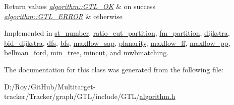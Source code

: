 \begin{DoxyRetVals}{Return values}
{\em \mbox{\hyperlink{classalgorithm_af1a0078e153aa99c24f9bdf0d97f6710a5114c20e4a96a76b5de9f28bf15e282b}{algorithm\+::\+G\+T\+L\+\_\+\+OK}}} & on success \\
\hline
{\em \mbox{\hyperlink{classalgorithm_af1a0078e153aa99c24f9bdf0d97f6710a6fcf574690bbd6cf710837a169510dd7}{algorithm\+::\+G\+T\+L\+\_\+\+E\+R\+R\+OR}}} & otherwise \\
\hline
\end{DoxyRetVals}


Implemented in \mbox{\hyperlink{classst__number_af902a0c05d07d47b587e8f7a6b7beaa1}{st\+\_\+number}}, \mbox{\hyperlink{classratio__cut__partition_a4ab180ca4cf57c811e3478c3de4c4dc3}{ratio\+\_\+cut\+\_\+partition}}, \mbox{\hyperlink{classfm__partition_a015b171fcaa01973ebe6c6a46a727097}{fm\+\_\+partition}}, \mbox{\hyperlink{classdijkstra_a7b30f3d8ad42baae27989bc14befe0d0}{dijkstra}}, \mbox{\hyperlink{classbid__dijkstra_a1d2f36d3977ef90285442a269a03b919}{bid\+\_\+dijkstra}}, \mbox{\hyperlink{classdfs_af0863b8974d5fd58cd0375c78ed8163b}{dfs}}, \mbox{\hyperlink{classbfs_a06ae16bd0f3bb2f8eb6b3e36659ba82e}{bfs}}, \mbox{\hyperlink{classmaxflow__sap_ab4305a2bb370ad9c43cc68d339b2dda0}{maxflow\+\_\+sap}}, \mbox{\hyperlink{classplanarity_a93232e765c08dd2a4c00d192bb48b5fc}{planarity}}, \mbox{\hyperlink{classmaxflow__ff_a0a4391b9093d6966b47c023a555099e2}{maxflow\+\_\+ff}}, \mbox{\hyperlink{classmaxflow__pp_a07c7cb1ae5db23d87cf49ce7769b2814}{maxflow\+\_\+pp}}, \mbox{\hyperlink{classbellman__ford_a226308389f3c36dfc02768c09f777a3b}{bellman\+\_\+ford}}, \mbox{\hyperlink{classmin__tree_ac025e8dad0db7a6a1e0e7b476b547802}{min\+\_\+tree}}, \mbox{\hyperlink{classmincut_ab7e374a3f73387aa61587643a5f44e43}{mincut}}, and \mbox{\hyperlink{classmwbmatching_adcb51caed21e77253940cd71bfd9a405}{mwbmatching}}.



The documentation for this class was generated from the following file\+:\begin{DoxyCompactItemize}
\item 
D\+:/\+Roy/\+Git\+Hub/\+Multitarget-\/tracker/\+Tracker/graph/\+G\+T\+L/include/\+G\+T\+L/\mbox{\hyperlink{algorithm_8h}{algorithm.\+h}}\end{DoxyCompactItemize}
